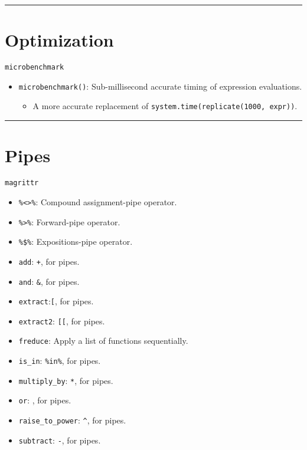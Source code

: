 \documentclass[]{book}
\providecommand{\tightlist}{%
  \setlength{\itemsep}{0pt}\setlength{\parskip}{0pt}}
\begin{document}
\begin{center}\rule{0.5\linewidth}{\linethickness}\end{center}

\hypertarget{optimization}{%
\section{Optimization}\label{optimization}}

\texttt{microbenchmark}

\begin{itemize}
\tightlist
\item
  \texttt{microbenchmark()}: Sub-millisecond accurate timing of expression evaluations.

  \begin{itemize}
  \tightlist
  \item
    A more accurate replacement of \texttt{system.time(replicate(1000,\ expr))}.
  \end{itemize}
\end{itemize}

\begin{center}\rule{0.5\linewidth}{\linethickness}\end{center}

\hypertarget{pipes}{%
\section{Pipes}\label{pipes}}

\texttt{magrittr}

\begin{itemize}
\tightlist
\item
  \texttt{\%\textless{}\textgreater{}\%}: Compound assignment-pipe operator.
\item
  \texttt{\%\textgreater{}\%}: Forward-pipe operator.
\item
  \texttt{\%\$\%}: Expositions-pipe operator.
\item
  \texttt{add}: \texttt{+}, for pipes.
\item
  \texttt{and}: \texttt{\&}, for pipes.
\item
  \texttt{extract}:\texttt{{[}}, for pipes.
\item
  \texttt{extract2}: \texttt{{[}{[}}, for pipes.
\item
  \texttt{freduce}: Apply a list of functions sequentially.
\item
  \texttt{is\_in}: \texttt{\%in\%}, for pipes.
\item
  \texttt{multiply\_by}: \texttt{*}, for pipes.
\item
  \texttt{or}: \texttt{\textbar{}}, for pipes.
\item
  \texttt{raise\_to\_power}: \texttt{\^{}}, for pipes.
\item
  \texttt{subtract}: \texttt{-}, for pipes.
\end{itemize}
\end{document}
